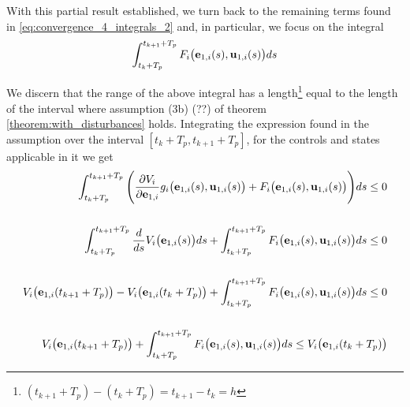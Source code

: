 With this partial result established, we turn back to the remaining terms
found in \eqref{eq:convergence_4_integrals_2} and, in particular, we focus on
the integral
\begin{align}
  \int_{t_k + T_p}^{t_{k+1} + T_p} F_i \big(\bm{\mathbf{e}}_{1,i}(s), \bm{\mathbf{u}}_{1,i} (s)\big) d s
\end{align}
\begin{gg_box}
  We discern that the range of the above integral has a length\footnote{$(t_{k+1} + T_p) - (t_k + T_p) = t_{k+1} - t_k = h$}
  equal to the length of the interval where assumption (3b) (??) of theorem
  \eqref{theorem:with_disturbances} holds.
  Integrating the expression found in the assumption over the
  interval $[t_k + T_p, t_{k+1} + T_p]$, for the controls and states applicable
  in it we get
  \begin{align}
    \int_{t_k + T_p}^{t_{k+1} + T_p} \Bigg(\dfrac{\partial V_i}{\partial \bm{\mathbf{e}}_{1,i}} g_i\big(\bm{\mathbf{e}}_{1,i}(s), \bm{\mathbf{u}}_{1,i}(s)\big)
    + F_i\big(\bm{\mathbf{e}}_{1,i}(s), \bm{\mathbf{u}}_{1,i}(s)\big)\Bigg) ds \leq 0 \\\\
    \int_{t_k + T_p}^{t_{k+1} + T_p} \dfrac{d}{ds} V_i\big(\bm{\mathbf{e}}_{1,i}(s)\big) d s
    + \int_{t_k + T_p}^{t_{k+1} + T_p} F_i\big(\bm{\mathbf{e}}_{1,i}(s), \bm{\mathbf{u}}_{1,i}(s)\big) ds \leq 0 \\\\
    V_i\big(\bm{\mathbf{e}}_{1,i}(t_{k+1} + T_p)\big) - V_i\big(\bm{\mathbf{e}}_{1,i}(t_k + T_p)\big)
    + \int_{t_k + T_p}^{t_{k+1} + T_p} F_i\big(\bm{\mathbf{e}}_{1,i}(s), \bm{\mathbf{u}}_{1,i}(s)\big) ds \leq 0 \\\\
    V_i\big(\bm{\mathbf{e}}_{1,i}(t_{k+1} + T_p)\big)
    + \int_{t_k + T_p}^{t_{k+1} + T_p} F_i\big(\bm{\mathbf{e}}_{1,i}(s), \bm{\mathbf{u}}_{1,i}(s)\big) ds \leq V_i\big(\bm{\mathbf{e}}_{1,i}(t_k + T_p)\big)
  \end{align}


\end{gg_box}
